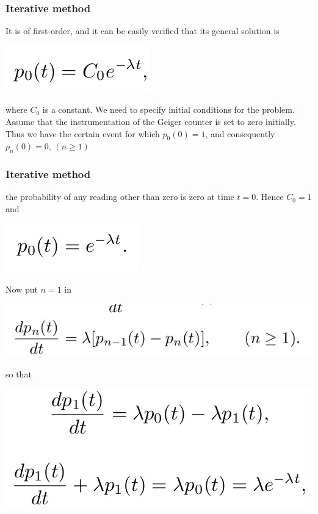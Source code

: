 \documentclass[spanish]{beamer}
\begin{document}
\begin{frame}
\frametitle{Iterative method}
It is of first-order, and it can be easily verified that its
general solution is

\begin{center}
\includegraphics[scale=0.4]{im21}
\end{center}
where $C_0$ is a constant. We need to specify initial conditions for the problem. Assume that the instrumentation of the Geiger counter is set to zero initially. Thus we have the certain event for which $p_{0} (0) = 1$, and consequently $p_n (0) = 0$, $(n \geq 1)$
\end{frame}
\begin{frame}
\frametitle{Iterative method}
the probability of any reading other than zero is zero at time $t = 0$. Hence $C_{0} = 1$ and

\begin{center}
\includegraphics[scale=0.4]{im22}
\end{center}

Now put $n = 1$ in 
\begin{center}
\includegraphics[scale=0.4]{im23}
\end{center}

so that

\begin{center}
\includegraphics[scale=0.4]{im24}
\end{center}

\end{frame}
\end{document}
